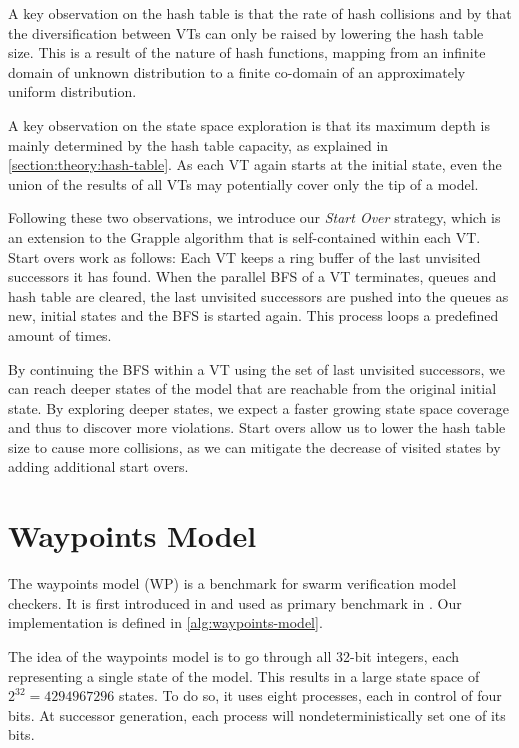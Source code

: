 \documentclass[
fancyheadings, %
%
%
]{stsreprt}
\begin{document}
A key observation on the hash table is that the rate of hash collisions and by that the diversification between VTs can only be raised by lowering the hash table size.
This is a result of the nature of hash functions, mapping from an infinite domain of unknown distribution to a finite co-domain of an approximately uniform distribution.

A key observation on the state space exploration is that its maximum depth is mainly determined by the hash table capacity, as explained in \cref{section:theory:hash-table}.
As each VT again starts at the initial state, even the union of the results of all VTs may potentially cover only the tip of a model.

Following these two observations, we introduce our \emph{Start Over} strategy, which is an extension to the Grapple algorithm that is self-contained within each VT.
Start overs work as follows:
Each VT keeps a ring buffer of the last unvisited successors it has found.
When the parallel BFS of a VT terminates, queues and hash table are cleared, the last unvisited successors are pushed into the queues as new, initial states and the BFS is started again.
This process loops a predefined amount of times.

By continuing the BFS within a VT using the set of last unvisited successors, we can reach deeper states of the model that are reachable from the original initial state.
By exploring deeper states, we expect a faster growing state space coverage and thus to discover more violations.
Start overs allow us to lower the hash table size to cause more collisions, as we can mitigate the decrease of visited states by adding additional start overs.

\section{Waypoints Model}
\label{section:theory:waypoints-model}

The waypoints model (WP) is a benchmark for swarm verification model checkers.
It is first introduced in \cite{Holzmann2011.Swarm-Verification-Techniques} and used as primary benchmark in \cite{DeFrancisco2020.Grapple}.
Our implementation is defined in \cref{alg:waypoints-model}.

The idea of the waypoints model is to go through all 32-bit integers, each representing a single state of the model.
This results in a large state space of $2^{32}=\num{4294967296}$ states.
To do so, it uses eight processes, each in control of four bits.
At successor generation, each process will nondeterministically set one of its bits.
\end{document}
